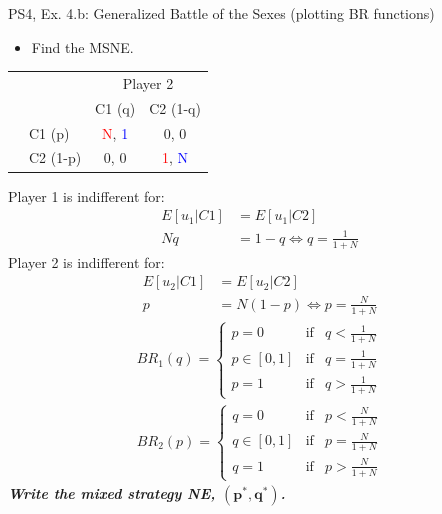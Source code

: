 \begin{frame}{PS4, Ex. 4.b: Generalized Battle of the Sexes (plotting BR functions)}
  \begin{multicols}{2}
    \begin{itemize}
      \item[(b)] Find the MSNE.
    \end{itemize}
    \vspace{-12pt}
    \begin{table}
      \begin{tabular}{cl|c|c|}
          & \multicolumn{1}{c}{} & \multicolumn{2}{c}{\color{blue}Player 2}\\
          \parbox[t]{1mm}{}
          &  &  &  \\
          & C1 (p)    & \textcolor{red}{N}, \textcolor{blue}{1} & 0, 0 \\
          & C2 (1-p)  & 0, 0 & \textcolor{red}{1}, \textcolor{blue}{N} \\
      \end{tabular}
    \end{table}
    Player 1 is indifferent for:
    \vspace{-2pt}
    \begin{align*}
      E[u_1|C1]&=E[u_1|C2]\\
      Nq &= 1-q \Leftrightarrow q = \frac{1}{1+N}
    \end{align*}
    Player 2 is indifferent for:
    \vspace{-2pt}
    \begin{align*}
      E[u_2|C1]&=E[u_2|C2]\\
      p &= N(1-p) \Leftrightarrow p = \frac{N}{1+N}
    \end{align*}
    \vspace{-8pt}
    \begin{align*}
      BR_1(q)=\left\{ \begin{array}{lcl}
          p=0       & \text{if} & q<\frac{1}{1+N} \\
          p\in[0,1] & \text{if} & q=\frac{1}{1+N} \\
          p=1       & \text{if} & q>\frac{1}{1+N}
      \end{array}\right. \\
      BR_2(p)=\left\{ \begin{array}{lcl}
          q=0       & \text{if} & p<\frac{N}{1+N}  \\
          q\in[0,1] & \text{if} & p=\frac{N}{1+N} \\
          q=1       & \text{if} & p>\frac{N}{1+N}
      \end{array}\right.
    \end{align*}
  \vfill\null \columnbreak
    \textbf{\textit{Write the mixed strategy NE, $\bm{(p^{*},q^{*})}$.}}
  \vfill\null
  \end{multicols}
\end{frame}

